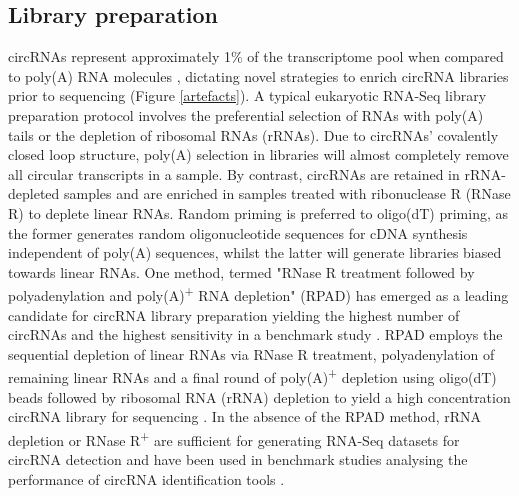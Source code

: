 \documentclass[pdflatex,sn-mathphys-num]{sn-jnl}
\begin{document}
\subsection{Library preparation}
circRNAs represent approximately 1\% of the transcriptome pool when compared to poly(A) RNA molecules \cite{Salzman2013Sep}, dictating novel strategies to enrich circRNA libraries prior to sequencing (Figure \ref{artefacts}). A typical eukaryotic RNA-Seq library preparation protocol involves the preferential selection of RNAs with poly(A) tails or the depletion of ribosomal RNAs (rRNAs). Due to circRNAs' covalently closed loop structure, poly(A) selection in libraries will almost completely remove all circular transcripts in a sample. By contrast, circRNAs are retained in rRNA-depleted samples and are enriched in samples treated with ribonuclease R (RNase R) to deplete linear RNAs. Random priming is preferred to oligo(dT) priming, as the former generates random oligonucleotide sequences for cDNA synthesis independent of poly(A) sequences, whilst the latter will generate libraries biased towards linear RNAs. One method, termed "RNase R treatment followed by polyadenylation and poly(A)\textsuperscript{+} RNA depletion" (RPAD) has emerged as a leading candidate for circRNA library preparation yielding the highest number of circRNAs and the highest sensitivity in a benchmark study \cite{Shi2022Dec}. RPAD employs the sequential depletion of linear RNAs via RNase R treatment, polyadenylation of remaining linear RNAs and a final round of poly(A)\textsuperscript{+} depletion using oligo(dT) beads followed by ribosomal RNA (rRNA) depletion to yield a high concentration circRNA library for sequencing \cite{Panda2017Jul, Pandey2019Feb}. In the absence of the RPAD method, rRNA depletion or RNase R\textsuperscript{+} are sufficient for generating RNA-Seq datasets for circRNA detection and have been used in benchmark studies analysing the performance of circRNA identification tools \cite{DCC}.
\end{document}
